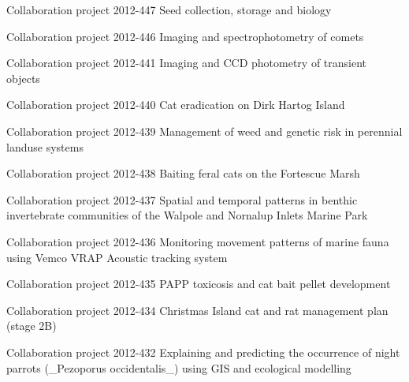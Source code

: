 \documentclass[version=last, paper=a4, DIV=18, usenames, dvipsnames]{scrartcl}
\begin{document}
\begin{longtabu}
  Collaboration project 2012-447 Seed collection, storage and biology \newline  \\ \hline

  Collaboration project 2012-446 Imaging and spectrophotometry of comets \newline  \\ \hline

  Collaboration project 2012-441 Imaging and CCD photometry of transient objects \newline  \\ \hline

  Collaboration project 2012-440 Cat eradication on Dirk Hartog Island \newline  \\ \hline

  Collaboration project 2012-439 Management of weed and genetic risk in perennial landuse systems \newline  \\ \hline

  Collaboration project 2012-438 Baiting feral cats on the Fortescue Marsh \newline  \\ \hline

  Collaboration project 2012-437 Spatial and temporal patterns in benthic invertebrate communities of the Walpole and Nornalup Inlets Marine Park \newline  \\ \hline

  Collaboration project 2012-436 Monitoring movement patterns of marine fauna using Vemco VRAP Acoustic tracking system \newline  \\ \hline

  Collaboration project 2012-435 PAPP toxicosis and cat bait pellet development \newline  \\ \hline

  Collaboration project 2012-434 Christmas Island cat and rat management plan (stage 2B) \newline  \\ \hline

  Collaboration project 2012-432 Explaining and predicting the occurrence of night parrots (\_Pezoporus occidentalis\_) using GIS and ecological modelling \newline  \\ \hline


\end{longtabu}
\end{document}
